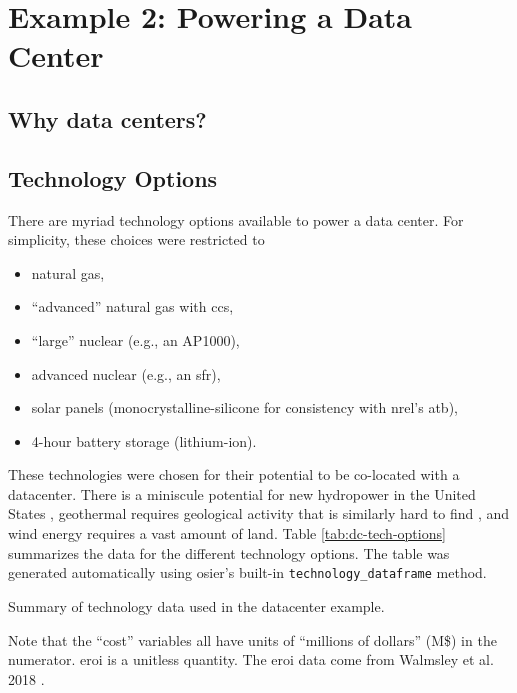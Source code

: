 \section{Example 2: Powering a Data Center}

\subsection{Why data centers?}

\subsection{Technology Options}
There are myriad technology options available to power a data center. For
simplicity, these choices were restricted to 
\begin{itemize}
    \item natural gas,
    \item ``advanced'' natural gas with \ac{ccs},
    \item ``large'' nuclear (e.g., an AP1000),
    \item advanced nuclear (e.g., an \ac{sfr}),
    \item solar panels (monocrystalline-silicone for consistency with
    \ac{nrel}'s \ac{atb}),
    \item 4-hour battery storage (lithium-ion).
\end{itemize}

\noindent
These technologies were chosen for their potential to be co-located with a
datacenter. There is a miniscule potential for new hydropower in the United
States \cite{lopez_us_2012}, geothermal requires geological activity that is
similarly hard to find \cite{lopez_us_2012}, and wind energy requires a vast
amount of land. Table \ref{tab:dc-tech-options} summarizes the data for the
different technology options. The table was generated automatically using
\ac{osier}'s built-in \texttt{technology\_dataframe} method. 
\begin{table}[htpb!]
    \centering
    \caption{Summary of technology data used in the datacenter example.}
    \label{tab:dc-tech-options}
    \resizebox{\columnwidth}{!}{}
\end{table}
\noindent
Note that the ``cost'' variables all have units of ``millions of dollars'' (M\$)
in the numerator. \ac{eroi} is a unitless quantity. The \ac{eroi} data come from
Walmsley et al. 2018 \cite{walmsley_energy_2018}.
 

